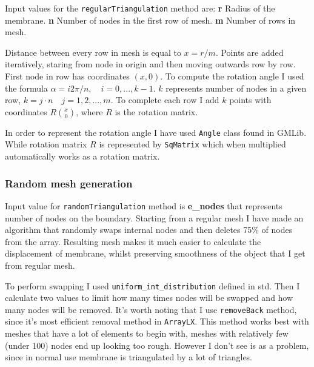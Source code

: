 \documentclass[a4,10pt]{article}
\begin{document}
Input values for the \verb|regularTriangulation| method are: \textbf{r} Radius of the membrane. \textbf{n} Number of nodes in the first row of mesh. \textbf{m} Number of rows in mesh.

Distance between every row in mesh is equal to $x = r/m$. Points are added iteratively, staring from node in origin and then moving outwards row by row.
First node in row has coordinates $(x, 0)$. To compute the rotation angle I used the formula $\alpha = i 2\pi / n, \quad i = 0,...,k-1$. $k$ represents number of nodes in a given row, $k = j \cdot n \quad j=1,2,...,m$. To complete each row I add $k$ points with coordinates $R \binom{x}{0}$, where $R$ is the rotation matrix.

In order to represent the rotation angle I have used \verb|Angle| class found in GMLib. While rotation matrix $R$ is represented by \verb|SqMatrix| which when multiplied automatically works as a rotation matrix. %

\subsubsection{Random mesh generation}
Input value for \verb|randomTriangulation| method is \textbf{e\_nodes} that represents number of nodes on the boundary. Starting from a regular mesh I have made an algorithm that randomly swaps internal nodes and then deletes 75\% of nodes from the array. Resulting mesh makes it much easier to calculate the displacement of membrane, whilst preserving smoothness of the object that I get from regular mesh.

To perform swapping I used \verb|uniform_int_distribution| defined in std. Then I calculate two values to limit how many times nodes will be swapped and how many nodes will be removed. It's worth noting that I use \verb|removeBack| method, since it's most efficient removal method in \verb|ArrayLX|. This method works best with meshes that have a lot of elements to begin with, meshes with relatively few (under 100) nodes end up looking too rough. However I don't see is as a problem, since in normal use membrane is triangulated by a lot of triangles.

\end{document}
